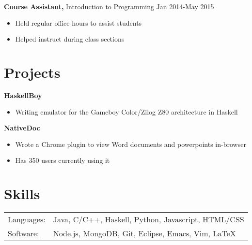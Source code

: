 \documentclass[margin]{res}
\begin{document}
\begin{resume}
                          {\bf Course Assistant,} Introduction to Programming \hfill Jan 2014-May 2015 \parskip -2pt
                          \begin{itemize} \itemsep -3pt
                          \item Held regular office hours to assist students
                          \item Helped instruct during class sections
                          \end{itemize}                              

                  \section{Projects}
                          {\bf HaskellBoy}
                          \begin{itemize} \itemsep -3pt
                          \item Writing emulator for the Gameboy Color/Zilog Z80 architecture in Haskell \smallskip
                          \end{itemize}
                          
                          {\bf NativeDoc}
                          \begin{itemize} \itemsep -3pt
                          \item Wrote a Chrome plugin to view Word documents and powerpoints in-browser
                          \item Has 350 users currently using it
                          \end{itemize}
                  
                  \section{Skills}
                  \begin{tabular}{l p{3in}}
                    \underline{Languages:} & Java, C/C++, Haskell, Python, Javascript, HTML/CSS\\
                    \underline{Software:} &  Node.js, MongoDB, Git, Eclipse, Emacs, Vim, \LaTeX
                  \end{tabular}

\end{resume}
\end{document}
